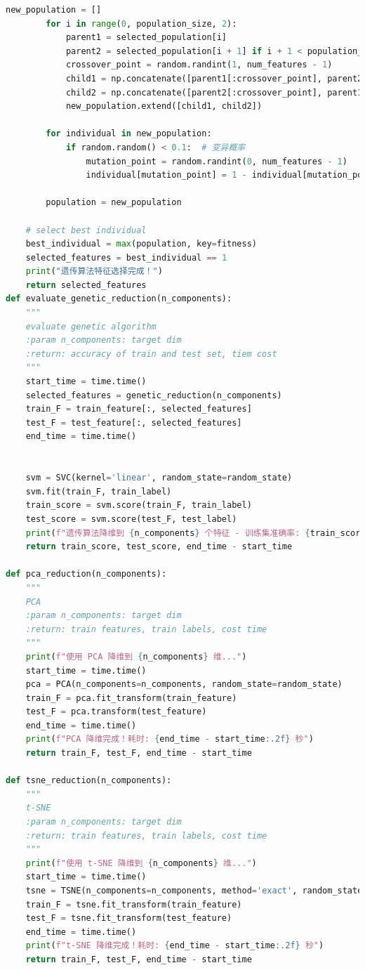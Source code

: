 \documentclass[lang=cn]{elegantpaper}
\begin{document}
\begin{lstlisting}[language=Python]
        new_population = []
        for i in range(0, population_size, 2):
            parent1 = selected_population[i]
            parent2 = selected_population[i + 1] if i + 1 < population_size else selected_population[0]
            crossover_point = random.randint(1, num_features - 1)
            child1 = np.concatenate([parent1[:crossover_point], parent2[crossover_point:]])
            child2 = np.concatenate([parent2[:crossover_point], parent1[crossover_point:]])
            new_population.extend([child1, child2])

        for individual in new_population:
            if random.random() < 0.1:  # 变异概率
                mutation_point = random.randint(0, num_features - 1)
                individual[mutation_point] = 1 - individual[mutation_point]

        population = new_population

    # select best individual
    best_individual = max(population, key=fitness)
    selected_features = best_individual == 1
    print("遗传算法特征选择完成！")
    return selected_features
def evaluate_genetic_reduction(n_components):
    """
    evaluate genetic algorithm
    :param n_components: target dim
    :return: accuracy of train and test set, tiem cost
    """
    start_time = time.time()
    selected_features = genetic_reduction(n_components)
    train_F = train_feature[:, selected_features]
    test_F = test_feature[:, selected_features]
    end_time = time.time()


    svm = SVC(kernel='linear', random_state=random_state)
    svm.fit(train_F, train_label)
    train_score = svm.score(train_F, train_label)
    test_score = svm.score(test_F, test_label)
    print(f"遗传算法降维到 {n_components} 个特征 - 训练集准确率: {train_score:.4f}, 测试集准确率: {test_score:.4f}")
    return train_score, test_score, end_time - start_time

def pca_reduction(n_components):
    """
    PCA 
    :param n_components: target dim
    :return: train features, train labels, cost time
    """
    print(f"使用 PCA 降维到 {n_components} 维...")
    start_time = time.time()
    pca = PCA(n_components=n_components, random_state=random_state)
    train_F = pca.fit_transform(train_feature)
    test_F = pca.transform(test_feature)
    end_time = time.time()
    print(f"PCA 降维完成！耗时: {end_time - start_time:.2f} 秒")
    return train_F, test_F, end_time - start_time

def tsne_reduction(n_components):
    """
    t-SNE
    :param n_components: target dim
    :return: train features, train labels, cost time
    """
    print(f"使用 t-SNE 降维到 {n_components} 维...")
    start_time = time.time()
    tsne = TSNE(n_components=n_components, method='exact', random_state=random_state)
    train_F = tsne.fit_transform(train_feature)
    test_F = tsne.fit_transform(test_feature)
    end_time = time.time()
    print(f"t-SNE 降维完成！耗时: {end_time - start_time:.2f} 秒")
    return train_F, test_F, end_time - start_time


\end{lstlisting}
\end{document}
